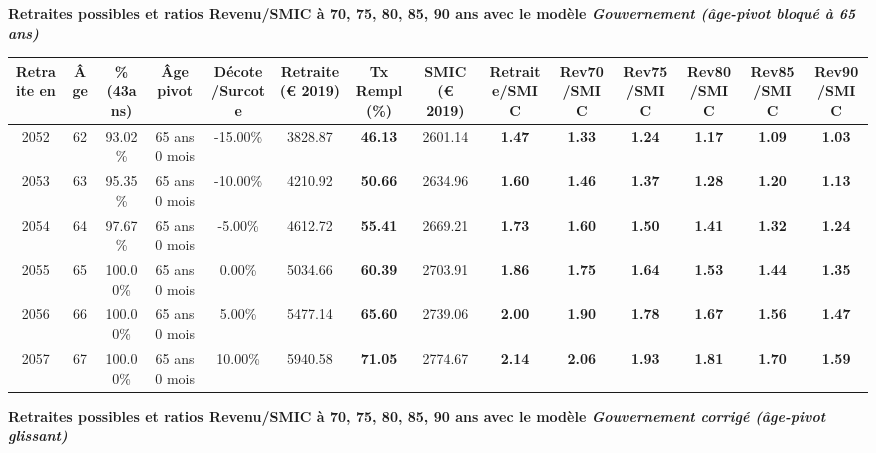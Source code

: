 {\bf \noindent Retraites possibles et ratios Revenu/SMIC à 70, 75, 80, 85, 90 ans avec le modèle \emph{Gouvernement (âge-pivot bloqué à 65 ans)}}  
 
\begin{adjustbox}{max width=\textwidth} 
\begin{tabular}[htb]{|c|c||c|c|c||c|c||c||c|c|c|c|c|c|} 
\hline 
 Retraite en &  Âge &  \%(43ans) &  Âge pivot &  Décote/Surcote &  Retraite (\euro{} 2019) &  Tx Rempl(\%) &  SMIC (\euro{} 2019) &  Retraite/SMIC &  Rev70/SMIC &  Rev75/SMIC &  Rev80/SMIC &  Rev85/SMIC &  Rev90/SMIC \\ 
\hline \hline 
 2052 &  62 &  93.02\% &  65 ans 0 mois &  -15.00\% &  3828.87 &  {\bf 46.13} &  2601.14 &  {\bf 1.47} &  {\bf 1.33} &  {\bf 1.24} &  {\bf 1.17} &  {\bf 1.09} &  {\bf 1.03} \\ 
\hline 
 2053 &  63 &  95.35\% &  65 ans 0 mois &  -10.00\% &  4210.92 &  {\bf 50.66} &  2634.96 &  {\bf 1.60} &  {\bf 1.46} &  {\bf 1.37} &  {\bf 1.28} &  {\bf 1.20} &  {\bf 1.13} \\ 
\hline 
 2054 &  64 &  97.67\% &  65 ans 0 mois &  -5.00\% &  4612.72 &  {\bf 55.41} &  2669.21 &  {\bf 1.73} &  {\bf 1.60} &  {\bf 1.50} &  {\bf 1.41} &  {\bf 1.32} &  {\bf 1.24} \\ 
\hline 
 2055 &  65 &  100.00\% &  65 ans 0 mois &  0.00\% &  5034.66 &  {\bf 60.39} &  2703.91 &  {\bf 1.86} &  {\bf 1.75} &  {\bf 1.64} &  {\bf 1.53} &  {\bf 1.44} &  {\bf 1.35} \\ 
\hline 
 2056 &  66 &  100.00\% &  65 ans 0 mois &  5.00\% &  5477.14 &  {\bf 65.60} &  2739.06 &  {\bf 2.00} &  {\bf 1.90} &  {\bf 1.78} &  {\bf 1.67} &  {\bf 1.56} &  {\bf 1.47} \\ 
\hline 
 2057 &  67 &  100.00\% &  65 ans 0 mois &  10.00\% &  5940.58 &  {\bf 71.05} &  2774.67 &  {\bf 2.14} &  {\bf 2.06} &  {\bf 1.93} &  {\bf 1.81} &  {\bf 1.70} &  {\bf 1.59} \\ 
\hline 
\hline 
\end{tabular} 
\end{adjustbox} 
 
 \vspace{0.1cm} 
{\bf \noindent Retraites possibles et ratios Revenu/SMIC à 70, 75, 80, 85, 90 ans avec le modèle \emph{Gouvernement corrigé (âge-pivot glissant)}}  
 
